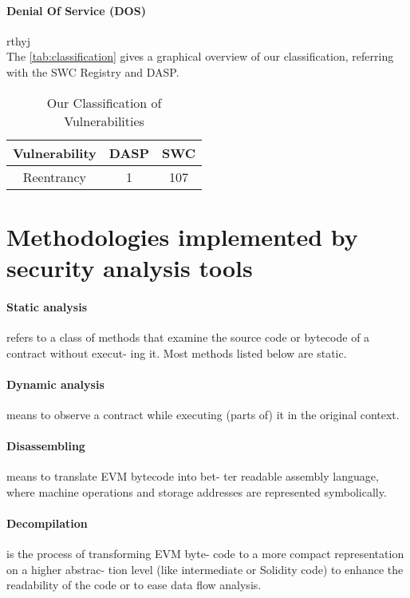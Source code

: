 \documentclass[a4paper,sigconf, language=french,
language=german, language=spanish, language=english]{acmart}
\begin{document}
\paragraph{Denial Of Service (DOS)}{rthyj}
\\
The \autoref{tab:classification} gives a graphical overview of our classification, referring with the SWC Registry and DASP.

\begin{center}
\begin{table} 
\caption{Our Classification of Vulnerabilities} 
  \begin{tabular}{c c c} 
    \hline
      Vulnerability & DASP & SWC \\ [0.5ex] 

    \hline\hline
    Reentrancy & 1 & 107
    
  \end{tabular}
  \label{tab:classification}
\end{table}
\end{center}

\section{Methodologies implemented by security analysis tools}
\label{MethodologiesForTools}
\paragraph{Static analysis} refers to a class of methods that examine
the source code or bytecode of a contract without execut-
ing it. Most methods listed below are static.
\paragraph{Dynamic analysis} means to observe a contract while
executing (parts of) it in the original context.
\paragraph{Disassembling} means to translate EVM bytecode into bet-
ter readable assembly language, where machine operations
and storage addresses are represented symbolically.
\paragraph{Decompilation} is the process of transforming EVM byte-
code to a more compact representation on a higher abstrac-
tion level (like intermediate or Solidity code) to enhance
the readability of the code or to ease data ﬂow analysis.
\end{document}
